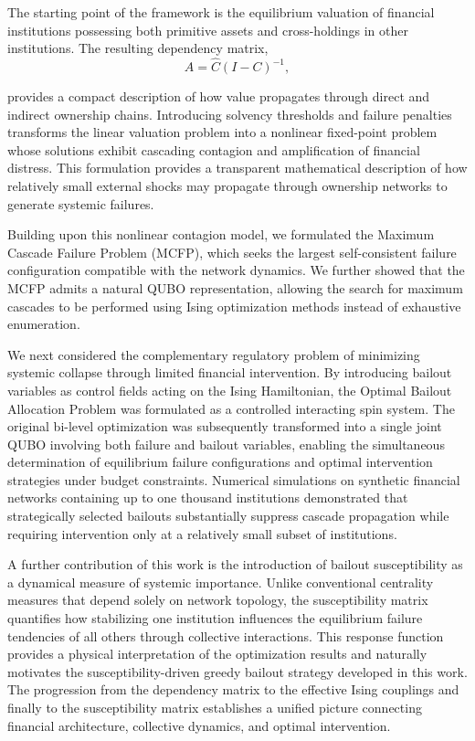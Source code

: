 \documentclass[aps,reprint,superscriptaddress,pra]{revtex4-2}
\begin{document}
The starting point of the framework is the equilibrium valuation of financial institutions possessing both primitive assets and cross-holdings in other institutions. The resulting dependency matrix,
\[
A=\hat{C}(I-C)^{-1},
\]

provides a compact description of how value propagates through direct and indirect ownership chains. Introducing solvency thresholds and failure penalties transforms the linear valuation problem into a nonlinear fixed-point problem whose solutions exhibit cascading contagion and amplification of financial distress. This formulation provides a transparent mathematical description of how relatively small external shocks may propagate through ownership networks to generate systemic failures.

Building upon this nonlinear contagion model, we formulated the Maximum Cascade Failure Problem (MCFP), which seeks the largest self-consistent failure configuration compatible with the network dynamics. We further showed that the MCFP admits a natural QUBO representation, allowing the search for maximum cascades to be performed using Ising optimization methods instead of exhaustive enumeration.

We next considered the complementary regulatory problem of minimizing systemic collapse through limited financial intervention. By introducing bailout variables as control fields acting on the Ising Hamiltonian, the Optimal Bailout Allocation Problem was formulated as a controlled interacting spin system. The original bi-level optimization was subsequently transformed into a single joint QUBO involving both failure and bailout variables, enabling the simultaneous determination of equilibrium failure configurations and optimal intervention strategies under budget constraints. Numerical simulations on synthetic financial networks containing up to one thousand institutions demonstrated that strategically selected bailouts substantially suppress cascade propagation while requiring intervention only at a relatively small subset of institutions.

A further contribution of this work is the introduction of bailout susceptibility as a dynamical measure of systemic importance. Unlike conventional centrality measures that depend solely on network topology, the susceptibility matrix quantifies how stabilizing one institution influences the equilibrium failure tendencies of all others through collective interactions. This response function provides a physical interpretation of the optimization results and naturally motivates the susceptibility-driven greedy bailout strategy developed in this work. The progression from the dependency matrix to the effective Ising couplings and finally to the susceptibility matrix establishes a unified picture connecting financial architecture, collective dynamics, and optimal intervention.
\end{document}
